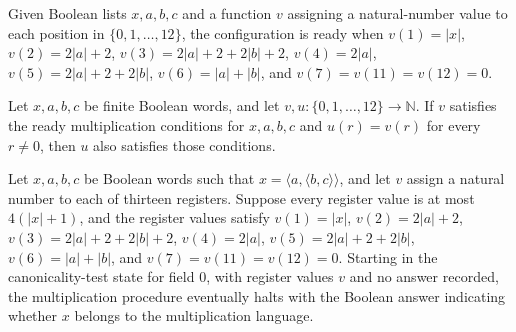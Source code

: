 \begin{definition}
\label{Complexity.MultReady}
\leanok
Given Boolean lists $x,a,b,c$ and a function $v$ assigning a natural-number value to
each position in $\{0,1,\ldots,12\}$, the configuration is ready when $v(1)=|x|$,
$v(2)=2|a|+2$, $v(3)=2|a|+2+2|b|+2$, $v(4)=2|a|$, $v(5)=2|a|+2+2|b|$, $v(6)=|a|+|b|$,
and $v(7)=v(11)=v(12)=0$.
\end{definition}

\begin{lemma}
\label{Complexity.mult_ready_frame}
\leanok
{}
Let $x,a,b,c$ be finite Boolean words, and let $v,u:\{0,1,\ldots,12\}\to\mathbb{N}$. If
$v$ satisfies the ready multiplication conditions for $x,a,b,c$ and $u(r)=v(r)$ for
every $r\ne 0$, then $u$ also satisfies those conditions.
\end{lemma}

\begin{lemma}
\label{Complexity.mult_canonical_run}
\leanok
{}
Let $x,a,b,c$ be Boolean words such that $x=\langle a,\langle b,c\rangle\rangle$, and
let $v$ assign a natural number to each of thirteen registers. Suppose every register
value is at most $4(|x|+1)$, and the register values satisfy $v(1)=|x|$, $v(2)=2|a|+2$,
$v(3)=2|a|+2+2|b|+2$, $v(4)=2|a|$, $v(5)=2|a|+2+2|b|$, $v(6)=|a|+|b|$, and
$v(7)=v(11)=v(12)=0$. Starting in the canonicality-test state for field $0$, with
register values $v$ and no answer recorded, the multiplication procedure eventually
halts with the Boolean answer indicating whether $x$ belongs to the multiplication
language.
\end{lemma}


